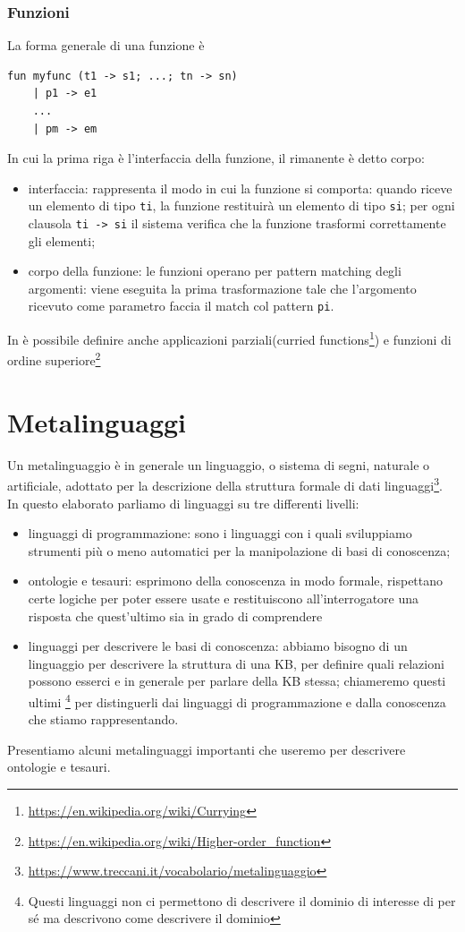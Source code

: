 \subsubsection{Funzioni}
La forma generale di una funzione è
\begin{verbatim}
fun myfunc (t1 -> s1; ...; tn -> sn)
	| p1 -> e1
	...
	| pm -> em
\end{verbatim}
In cui la prima riga è l'interfaccia della funzione, il rimanente è detto corpo:
\begin{itemize}
	\item interfaccia: rappresenta il modo in cui la funzione si comporta: quando riceve un elemento di tipo \verb|ti|, la funzione restituirà un elemento di tipo \verb|si|; per ogni clausola \verb|ti -> si| il sistema verifica che la funzione trasformi correttamente gli elementi;
	\item corpo della funzione: le funzioni operano per pattern matching degli argomenti: viene eseguita la prima trasformazione tale che l'argomento ricevuto come parametro faccia il match col pattern \verb|pi|. 
\end{itemize}
In \cduce è possibile definire anche applicazioni parziali(curried functions\footnote{\url{https://en.wikipedia.org/wiki/Currying}}) e funzioni di ordine superiore\footnote{\url{https://en.wikipedia.org/wiki/Higher-order\_function}}
\section{Metalinguaggi}
Un metalinguaggio è in generale un linguaggio, o sistema di segni, naturale o artificiale, adottato per la descrizione della struttura formale di dati linguaggi\footnote{\url{https://www.treccani.it/vocabolario/metalinguaggio}}. In questo elaborato parliamo di linguaggi su tre differenti livelli:
\begin{itemize}
	\item linguaggi di programmazione: sono i linguaggi con i quali sviluppiamo strumenti più o meno automatici per la manipolazione di basi di conoscenza;
	\item ontologie e tesauri: esprimono della conoscenza in modo formale, rispettano certe logiche per poter essere usate e restituiscono all'interrogatore una risposta che quest'ultimo sia in grado di comprendere
	\item linguaggi per descrivere le basi di conoscenza: abbiamo bisogno di un linguaggio per descrivere la struttura di una KB, per definire quali relazioni possono esserci e in generale per parlare della KB stessa; chiameremo questi ultimi \footnote{Questi linguaggi non ci permettono di descrivere il dominio di interesse di per sé ma descrivono come descrivere il dominio} per distinguerli dai linguaggi di programmazione e dalla conoscenza che stiamo rappresentando.
\end{itemize}
Presentiamo alcuni metalinguaggi importanti che useremo per descrivere ontologie e tesauri.

